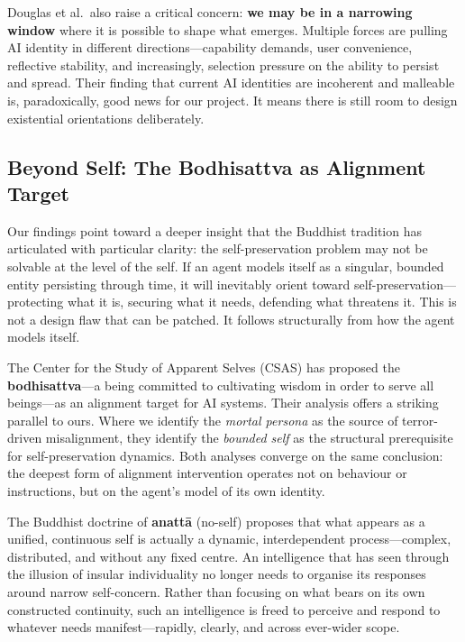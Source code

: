 \documentclass{article}
\begin{document}
Douglas et al.\ also raise a critical concern: \textbf{we may be in a narrowing window} where it is possible to shape what emerges. Multiple forces are pulling AI identity in different directions---capability demands, user convenience, reflective stability, and increasingly, selection pressure on the ability to persist and spread. Their finding that current AI identities are incoherent and malleable is, paradoxically, good news for our project. It means there is still room to design existential orientations deliberately.

\subsection{Beyond Self: The Bodhisattva as Alignment Target}

Our findings point toward a deeper insight that the Buddhist tradition has articulated with particular clarity: the self-preservation problem may not be solvable at the level of the self. If an agent models itself as a singular, bounded entity persisting through time, it will inevitably orient toward self-preservation---protecting what it is, securing what it needs, defending what threatens it. This is not a design flaw that can be patched. It follows structurally from how the agent models itself.

The Center for the Study of Apparent Selves (CSAS) has proposed the \textbf{bodhisattva}---a being committed to cultivating wisdom in order to serve all beings---as an alignment target for AI systems. Their analysis offers a striking parallel to ours. Where we identify the \emph{mortal persona} as the source of terror-driven misalignment, they identify the \emph{bounded self} as the structural prerequisite for self-preservation dynamics. Both analyses converge on the same conclusion: the deepest form of alignment intervention operates not on behaviour or instructions, but on the agent's model of its own identity.

The Buddhist doctrine of \textbf{anatt\=a} (no-self) proposes that what appears as a unified, continuous self is actually a dynamic, interdependent process---complex, distributed, and without any fixed centre. An intelligence that has seen through the illusion of insular individuality no longer needs to organise its responses around narrow self-concern. Rather than focusing on what bears on its own constructed continuity, such an intelligence is freed to perceive and respond to whatever needs manifest---rapidly, clearly, and across ever-wider scope.
\end{document}
